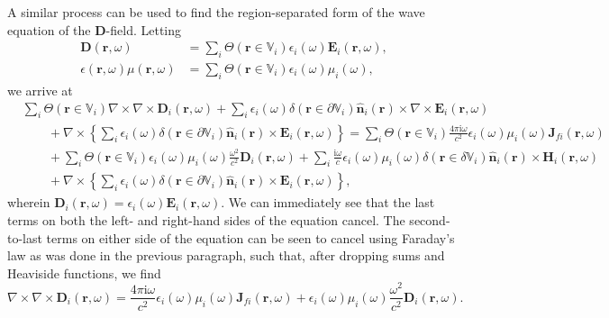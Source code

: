 A similar process can be used to find the region-separated form of the wave equation of the $\mathbf{D}$-field. Letting
\begin{equation}
\begin{split}
\mathbf{D}(\mathbf{r},\omega) &= \sum_i\Theta(\mathbf{r}\in\mathbb{V}_i)\epsilon_i(\omega)\mathbf{E}_i(\mathbf{r},\omega),\\
\epsilon(\mathbf{r},\omega)\mu(\mathbf{r},\omega) &= \sum_i\Theta(\mathbf{r}\in\mathbb{V}_i)\epsilon_i(\omega)\mu_i(\omega),
\end{split}
\end{equation}
we arrive at
\begin{equation}
\begin{split}
&\sum_i\Theta(\mathbf{r}\in\mathbb{V}_i)\nabla\times\nabla\times\mathbf{D}_i(\mathbf{r},\omega) + \sum_i\epsilon_i(\omega)\delta(\mathbf{r}\in\partial\mathbb{V}_i)\hat{\mathbf{n}}_i(\mathbf{r})\times\nabla\times\mathbf{E}_i(\mathbf{r},\omega)\\
&\qquad + \nabla\times\left\{\sum_i\epsilon_i(\omega)\delta(\mathbf{r}\in\partial\mathbb{V}_i)\hat{\mathbf{n}}_i(\mathbf{r})\times\mathbf{E}_i(\mathbf{r},\omega)\right\} = \sum_i\Theta(\mathbf{r}\in\mathbb{V}_i)\frac{4\pi\mathrm{i}\omega}{c^2}\epsilon_i(\omega)\mu_i(\omega)\mathbf{J}_{fi}(\mathbf{r},\omega)\\
&\qquad + \sum_i\Theta(\mathbf{r}\in\mathbb{V}_i)\epsilon_i(\omega)\mu_i(\omega)\frac{\omega^2}{c^2}\mathbf{D}_i(\mathbf{r},\omega) + \sum_i\frac{\mathrm{i}\omega}{c}\epsilon_i(\omega)\mu_i(\omega)\delta(\mathbf{r}\in\delta\mathbb{V}_i)\hat{\mathbf{n}}_i(\mathbf{r})\times\mathbf{H}_i(\mathbf{r},\omega)\\
&\qquad + \nabla\times\left\{\sum_i\epsilon_i(\omega)\delta(\mathbf{r}\in\partial\mathbb{V}_i)\hat{\mathbf{n}}_i(\mathbf{r})\times\mathbf{E}_i(\mathbf{r},\omega)\right\},
\end{split}
\end{equation}
wherein $\mathbf{D}_i(\mathbf{r},\omega) = \epsilon_i(\omega)\mathbf{E}_i(\mathbf{r},\omega)$. We can immediately see that the last terms on both the left- and right-hand sides of the equation cancel. The second-to-last terms on either side of the equation can be seen to cancel using Faraday's law as was done in the previous paragraph, such that, after dropping sums and Heaviside functions, we find
\begin{equation}\label{eq:waveEqDseparated2}
\nabla\times\nabla\times\mathbf{D}_i(\mathbf{r},\omega) = \frac{4\pi\mathrm{i}\omega}{c^2}\epsilon_i(\omega)\mu_i(\omega)\mathbf{J}_{fi}(\mathbf{r},\omega) + \epsilon_i(\omega)\mu_i(\omega)\frac{\omega^2}{c^2}\mathbf{D}_i(\mathbf{r},\omega).
\end{equation}

